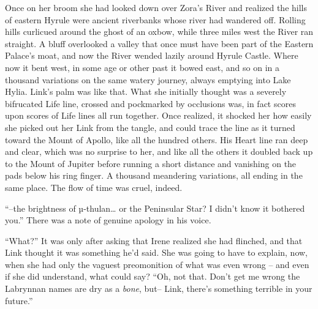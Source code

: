 \documentclass[../FGP.tex]{subfiles}
\begin{document}
\begin{fragment}
Once on her broom she had looked down over Zora's River and realized the hills of eastern Hyrule were ancient riverbanks whose river had wandered off.%
Rolling hills curlicued around the ghost of an oxbow, while three miles west the River ran straight. A bluff overlooked a valley that once must have been part of the Eastern Palace's moat, and now the River wended lazily around Hyrule Castle. Where now it bent west, in some age or other past it bowed east, and so on in a thousand variations on the same watery journey, always emptying into Lake Hylia. Link's palm was like that. What she initially thought was a severely bifrucated Life line, crossed and pockmarked by occlusions was, in  fact scores upon scores of Life lines all run together. Once realized, it shocked her how easily she picked out her Link%
    \reversemarginpar{}
from the tangle, and could trace the line as it turned toward the Mount of Apollo, like all the hundred others. His Heart line ran deep and clear, which was no surprise to her, and like all the others it doubled back up to the Mount of Jupiter before running a short distance and vanishing on the pads below his ring finger. A thousand meandering variations, all ending in the same place. The flow of time was cruel, indeed.

``--the brightness of {\Gr µ}-thulan\ldots{} or the Peninsular Star? I didn't know it bothered you.'' There was a note of genuine apology in his voice.

``What?'' It was only after asking that Irene realized she had flinched, and that Link thought it was something he'd said. She was going to have to explain, now, when she had only the vaguest preomonition of what was even wrong -- and even if she did understand, what could say? ``Oh, not that. Don't get me wrong the Labrynnan names are dry as a \emph{bone}, but-- Link, there's something terrible in your future.''  


\end{fragment}
\end{document}
